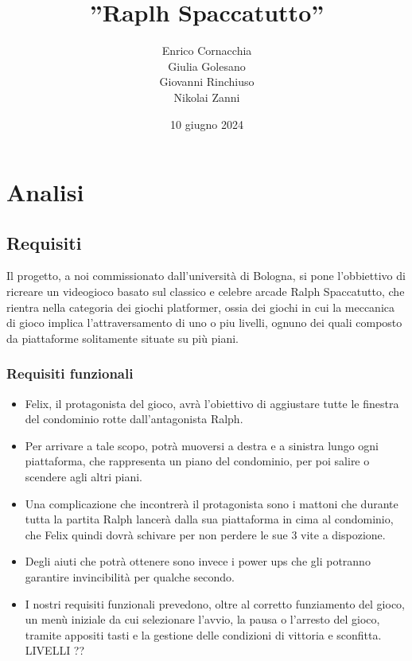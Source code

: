 \title{''Raplh Spaccatutto''}

\author{Enrico Cornacchia \\ Giulia Golesano \\ Giovanni Rinchiuso \\ Nikolai Zanni}
\date{10 giugno 2024}



\maketitle

\tableofcontents

\chapter{Analisi}

\section{Requisiti}

Il progetto, a noi commissionato dall'università di Bologna, si pone l'obbiettivo di ricreare un videogioco basato sul classico e celebre arcade Ralph Spaccatutto, che rientra nella categoria dei giochi platformer, ossia dei giochi in cui la meccanica di gioco implica l'attraversamento di uno o piu livelli, ognuno dei quali composto da piattaforme solitamente situate su più piani.

\subsection{Requisiti funzionali}

\begin{itemize}


	//SPIEGA MEGLIO COME FUNZIONA IL GIOCO
	\item Felix, il protagonista del gioco, avrà l'obiettivo di aggiustare tutte le finestra del condominio rotte dall'antagonista Ralph. 
	\item Per arrivare a tale scopo, potrà muoversi a destra e a sinistra lungo ogni piattaforma, che rappresenta un piano del condominio, per poi salire o scendere agli altri piani.
	\item Una complicazione che incontrerà il protagonista sono i mattoni che durante tutta la partita Ralph lancerà dalla sua piattaforma in cima al condominio, che Felix quindi dovrà schivare per non perdere le sue 3 vite a dispozione.
	\item Degli aiuti che potrà ottenere sono invece i power ups che gli potranno garantire invincibilità per qualche secondo.
	\item I nostri requisiti funzionali prevedono, oltre al corretto funziamento del gioco, un menù iniziale da cui selezionare l'avvio, la pausa o l'arresto del gioco, tramite appositi tasti e la gestione delle condizioni di vittoria e sconfitta.
	LIVELLI ??
\end{itemize}


